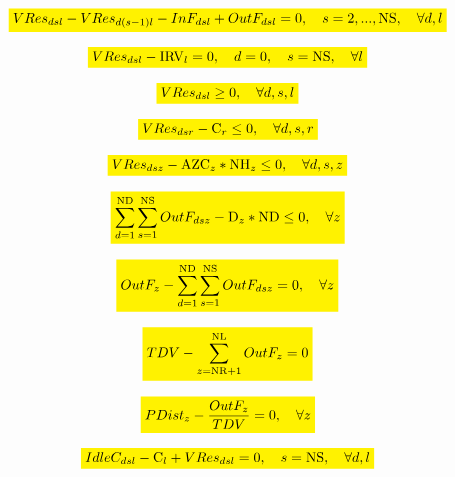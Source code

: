 \documentclass{singlecol}
\newcommand{\mathcolorbox}[2]{\colorbox{#1}{$\displaystyle #2$}}
\theoremstyle{TH}{
\newtheorem{lemma}{Lemma}
\newtheorem{theorem}[lemma]{Theorem}
\newtheorem{corrolary}[lemma]{Corrolary}
\newtheorem{conjecture}[lemma]{Conjecture}
\newtheorem{proposition}[lemma]{Proposition}
\newtheorem{claim}[lemma]{Claim}
\newtheorem{stheorem}[lemma]{Wrong Theorem}
\newtheorem{algorithm}{Algorithm}
}
\theoremstyle{THrm}{
\newtheorem{definition}{Definition}[section]
\newtheorem{question}{Question}[section]
\newtheorem{remark}{Remark}
\newtheorem{scheme}{Scheme}
}
\theoremstyle{THhit}{
\newtheorem{case}{Case}[section]
}
\begin{document}
\begin{equation}
	\mathcolorbox{yellow}{VRes_{dsl} - VRes_{d(s-1)l} - InF_{dsl} + OutF_{dsl} = 0, \quad s=2,...,\mathrm{NS}, \quad \forall{d,l}}
	\label{eq:volRem!T1}
\end{equation}

\begin{equation}
	\mathcolorbox{yellow}{VRes_{dsl} - \mathrm{IRV}_l = 0, \quad d = 0, \quad s = \mathrm{NS}, \quad \forall{l}}
	\label{eq:volRStart}
\end{equation}

\begin{equation}
	\mathcolorbox{yellow}{VRes_{dsl} \geq 0, \quad \forall{d,s,l}}
	\label{eq:minRV}
\end{equation}

\begin{equation}
	\mathcolorbox{yellow}{VRes_{dsr} - \mathrm{C}_{r} \leq 0, \quad \forall{d,s,r}}
	\label{eq:maxRV}
\end{equation}

\begin{equation}
	\mathcolorbox{yellow}{VRes_{dsz} - \mathrm{AZC}_z*\mathrm{NH}_z \leq 0, \quad \forall{d,s,z}}
	\label{eq:maxRZV}
\end{equation}

\begin{equation}
	\mathcolorbox{yellow}{\sum_{d=1}^{\mathrm{ND}}\sum_{s=1}^{\mathrm{NS}}{OutF_{dsz}} -  \mathrm{D}_z*\mathrm{ND} \leq 0,  \quad \forall z}
	\label{eq:demandRes}
\end{equation}

\begin{equation}
	\mathcolorbox{yellow}{OutF_{z} - \sum_{d=1}^{\mathrm{ND}}\sum_{s=1}^{\mathrm{NS}}{OutF_{dsz}} = 0, \quad \forall z}
	\label{eq:evalTOutFZone}
\end{equation}

\begin{equation}
	\mathcolorbox{yellow}{TDV - \sum_{z=\mathrm{NR}+1}^{\mathrm{NL}}{OutF_{z}} = 0}
	\label{eq:evalTOutF}
\end{equation}

\begin{equation}
	\mathcolorbox{yellow}{PDist_{z} - \dfrac{OutF_{z}}{TDV} = 0, \quad \forall z}
	\label{eq:evalPDist}
\end{equation}

\begin{equation}
	\mathcolorbox{yellow}{IdleC_{dsl} - \mathrm{C}_{l} + VRes_{dsl} = 0, \quad s = \mathrm{NS}, \quad \forall{d, l}}
	\label{eq:evalIdleCap}
\end{equation}
\end{document}

